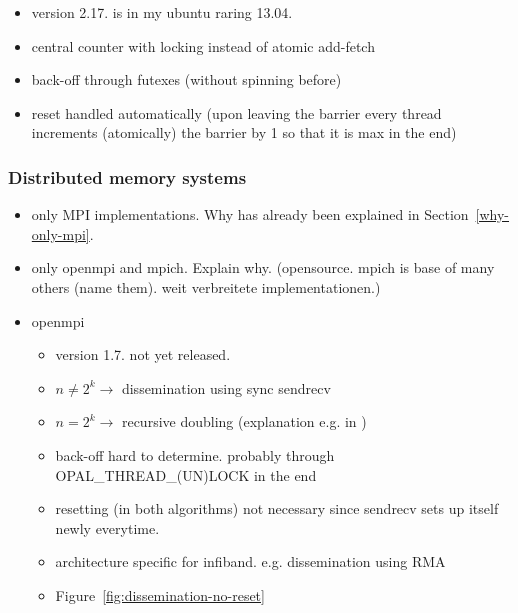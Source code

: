 \documentclass[a4paper, 10pt]{article}
\begin{document}
\begin{enumerate}
\begin{itemize}
		\begin{itemize}
			\item version 2.17. is in my ubuntu raring 13.04.
			\item central counter with locking instead of atomic add-fetch
			\item back-off through futexes (without spinning before)
			\item reset handled automatically (upon leaving the barrier every thread increments (atomically) the barrier by 1 so that it is max in the end)
		\end{itemize}
\end{itemize}

\subsubsection{Distributed memory systems}
\label{sssec:existing-currently-used-distributed}
\begin{itemize}
	\item only MPI implementations. Why has already been explained in Section~\ref{why-only-mpi}.
	\item only openmpi and mpich. Explain why. (opensource. mpich is base of many others (name them). weit verbreitete implementationen.)
	\item openmpi
		\begin{itemize}
			\item version 1.7. not yet released.
			\item $n \neq 2^k \rightarrow$ dissemination\cite{hensgen1988} using sync sendrecv
			\item $n = 2^k \rightarrow$ recursive doubling (explanation e.g. in \cite{hoefler2005})
			\item back-off hard to determine. probably through OPAL\_THREAD\_(UN)LOCK in the end
			\item resetting (in both algorithms) not necessary since sendrecv sets up itself newly everytime.
			\item architecture specific for infiband. e.g. dissemination using RMA \cite{hoefler2006a}
			\item Figure~\ref{fig:dissemination-no-reset}

\end{itemize}
\end{itemize}
\end{enumerate}
\end{document}
